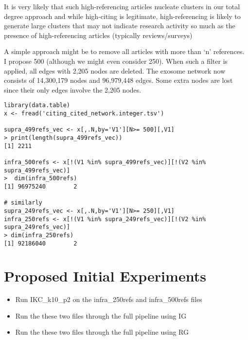 \documentclass[11pt, oneside]{article}   	%
\begin{document}
It is very likely that such high-referencing articles nucleate clusters in our total degree approach and while high-citing is legitimate, high-referencing is likely to generate large clusters that may not indicate research activity so much as the presence of high-referencing articles (typically reviews/surveys)

A simple approach might be to remove all articles with more than `n' references. I propose 500 (although we might even consider 250). When such a filter is applied, all edges with 2,205 nodes are deleted. The exosome network now consists of 14,300,179 nodes and 96,979,448 edges. Some extra nodes are lost since their only edges involve the 2,205 nodes.

\begin{verbatim}
library(data.table)
x <- fread('citing_cited_network.integer.tsv')

supra_499refs_vec <- x[,.N,by='V1'][N>= 500][,V1]
> print(length(supra_499refs_vec))
[1] 2211

infra_500refs <- x[!(V1 %in% supra_499refs_vec)][!(V2 %in% supra_499refs_vec)]
>  dim(infra_500refs)
[1] 96975240        2

# similarly 
supra_249refs_vec <- x[,.N,by='V1'][N>= 250][,V1]
infra_250refs <- x[!(V1 %in% supra_249refs_vec)][!(V2 %in% supra_249refs_vec)]
> dim(infra_250refs)
[1] 92186040        2
\end{verbatim}

\section*{Proposed Initial Experiments}
\begin{itemize}
\item Run  IKC\_k10\_p2 on the  infra\_250refs and infra\_500refs files
\item Run the these two files through the full pipeline using IG
\item Run the these two files through the full pipeline using RG
\end{itemize}
\end{document}
